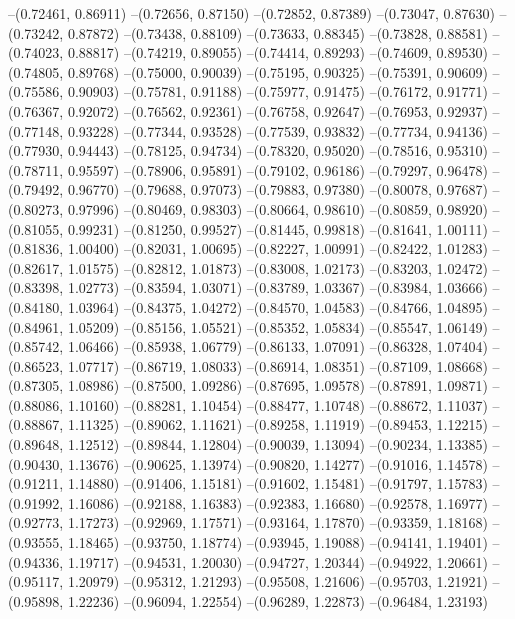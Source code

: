 --(0.72461, 0.86911)
--(0.72656, 0.87150)
--(0.72852, 0.87389)
--(0.73047, 0.87630)
--(0.73242, 0.87872)
--(0.73438, 0.88109)
--(0.73633, 0.88345)
--(0.73828, 0.88581)
--(0.74023, 0.88817)
--(0.74219, 0.89055)
--(0.74414, 0.89293)
--(0.74609, 0.89530)
--(0.74805, 0.89768)
--(0.75000, 0.90039)
--(0.75195, 0.90325)
--(0.75391, 0.90609)
--(0.75586, 0.90903)
--(0.75781, 0.91188)
--(0.75977, 0.91475)
--(0.76172, 0.91771)
--(0.76367, 0.92072)
--(0.76562, 0.92361)
--(0.76758, 0.92647)
--(0.76953, 0.92937)
--(0.77148, 0.93228)
--(0.77344, 0.93528)
--(0.77539, 0.93832)
--(0.77734, 0.94136)
--(0.77930, 0.94443)
--(0.78125, 0.94734)
--(0.78320, 0.95020)
--(0.78516, 0.95310)
--(0.78711, 0.95597)
--(0.78906, 0.95891)
--(0.79102, 0.96186)
--(0.79297, 0.96478)
--(0.79492, 0.96770)
--(0.79688, 0.97073)
--(0.79883, 0.97380)
--(0.80078, 0.97687)
--(0.80273, 0.97996)
--(0.80469, 0.98303)
--(0.80664, 0.98610)
--(0.80859, 0.98920)
--(0.81055, 0.99231)
--(0.81250, 0.99527)
--(0.81445, 0.99818)
--(0.81641, 1.00111)
--(0.81836, 1.00400)
--(0.82031, 1.00695)
--(0.82227, 1.00991)
--(0.82422, 1.01283)
--(0.82617, 1.01575)
--(0.82812, 1.01873)
--(0.83008, 1.02173)
--(0.83203, 1.02472)
--(0.83398, 1.02773)
--(0.83594, 1.03071)
--(0.83789, 1.03367)
--(0.83984, 1.03666)
--(0.84180, 1.03964)
--(0.84375, 1.04272)
--(0.84570, 1.04583)
--(0.84766, 1.04895)
--(0.84961, 1.05209)
--(0.85156, 1.05521)
--(0.85352, 1.05834)
--(0.85547, 1.06149)
--(0.85742, 1.06466)
--(0.85938, 1.06779)
--(0.86133, 1.07091)
--(0.86328, 1.07404)
--(0.86523, 1.07717)
--(0.86719, 1.08033)
--(0.86914, 1.08351)
--(0.87109, 1.08668)
--(0.87305, 1.08986)
--(0.87500, 1.09286)
--(0.87695, 1.09578)
--(0.87891, 1.09871)
--(0.88086, 1.10160)
--(0.88281, 1.10454)
--(0.88477, 1.10748)
--(0.88672, 1.11037)
--(0.88867, 1.11325)
--(0.89062, 1.11621)
--(0.89258, 1.11919)
--(0.89453, 1.12215)
--(0.89648, 1.12512)
--(0.89844, 1.12804)
--(0.90039, 1.13094)
--(0.90234, 1.13385)
--(0.90430, 1.13676)
--(0.90625, 1.13974)
--(0.90820, 1.14277)
--(0.91016, 1.14578)
--(0.91211, 1.14880)
--(0.91406, 1.15181)
--(0.91602, 1.15481)
--(0.91797, 1.15783)
--(0.91992, 1.16086)
--(0.92188, 1.16383)
--(0.92383, 1.16680)
--(0.92578, 1.16977)
--(0.92773, 1.17273)
--(0.92969, 1.17571)
--(0.93164, 1.17870)
--(0.93359, 1.18168)
--(0.93555, 1.18465)
--(0.93750, 1.18774)
--(0.93945, 1.19088)
--(0.94141, 1.19401)
--(0.94336, 1.19717)
--(0.94531, 1.20030)
--(0.94727, 1.20344)
--(0.94922, 1.20661)
--(0.95117, 1.20979)
--(0.95312, 1.21293)
--(0.95508, 1.21606)
--(0.95703, 1.21921)
--(0.95898, 1.22236)
--(0.96094, 1.22554)
--(0.96289, 1.22873)
--(0.96484, 1.23193)
